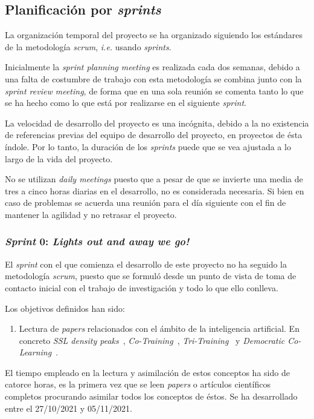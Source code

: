 \subsection{Planificación por \textit{sprints}}
La organización temporal del proyecto se ha organizado siguiendo los estándares de la metodología \textit{scrum}, \textit{i.e.} usando \textit{sprints}. 

Inicialmente la \textit{sprint planning meeting} es realizada cada dos semanas, debido a una falta de costumbre de trabajo con esta metodología se combina junto con la \textit{sprint review meeting}, de forma que en una sola reunión se comenta tanto lo que se ha hecho como lo que está por realizarse en el siguiente \textit{sprint}.

La velocidad de desarrollo del proyecto es una incógnita, debido a la no existencia de referencias previas del equipo de desarrollo del proyecto, en proyectos de ésta índole. Por lo tanto, la duración de los \textit{sprints} puede que se vea ajustada a lo largo de la vida del proyecto.

No se utilizan \textit{daily meetings} puesto que a pesar de que se invierte una media de tres a cinco horas diarias en el desarrollo, no es considerada necesaria. Si bien en caso de problemas se acuerda una reunión para el día siguiente con el fin de mantener la agilidad y no retrasar el proyecto.

\subsubsection{\textit{Sprint} 0: \textit{Lights out and away we go!} }
El \textit{sprint} con el que comienza el desarrollo de este proyecto no ha seguido la metodología \textit{scrum}, puesto que se formuló desde un punto de vista de toma de contacto inicial con el trabajo de investigación y todo lo que ello conlleva.

Los objetivos definidos han sido:
\begin{enumerate}
\item Lectura de \textit{papers} relacionados con el ámbito de la inteligencia artificial. En concreto \textit{SSL density peaks}~\cite{wu2018self}, \textit{Co-Training}~\cite{blum1998combining}, \textit{Tri-Training}~\cite{zhou2005tri} y \textit{Democratic Co-Learning}~\cite{zhou2004democratic}.
\end{enumerate}

El tiempo empleado en la lectura y asimilación de estos conceptos ha sido de catorce horas, es la primera vez que se leen \textit{papers} o artículos científicos completos procurando asimilar todos los conceptos de éstos. Se ha desarrollado entre el 27/10/2021 y 05/11/2021.

